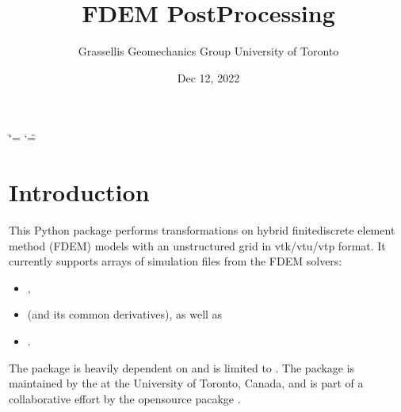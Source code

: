 \documentclass[letterpaper,10pt,english]{sphinxmanual}
\title{FDEM Post\sphinxhyphen{}Processing}
\date{Dec 12, 2022}
\author{Grasselli\textquotesingle{}s Geomechanics Group \sphinxhyphen{} University of Toronto}
\begin{document}
\ifdefined\shorthandoff
  \ifnum\catcode`\=\string=\active\shorthandoff{=}\fi
  \ifnum\catcode`\"=\active{}\fi
\fi

\pagestyle{empty}
\sphinxmaketitle
\pagestyle{plain}
\sphinxtableofcontents
\pagestyle{normal}
\label{\detokenize{index::doc}}


\sphinxstepscope


\chapter{Introduction}
\label{\detokenize{postprocessing_intro:introduction}}\label{\detokenize{postprocessing_intro::doc}}
\sphinxAtStartPar
This Python package performs transformations on hybrid finite\sphinxhyphen{}discrete element method (FDEM) models with an unstructured grid in vtk/vtu/vtp format. It currently supports arrays of simulation files from the FDEM solvers:
\begin{itemize}
\item {} 
\sphinxAtStartPar
{},

\item {} 
\sphinxAtStartPar
{} (and its common derivatives), as well as

\item {} 
\sphinxAtStartPar
{}.

\end{itemize}

\sphinxAtStartPar
The package is heavily dependent on  and is limited to . The package is maintained by the  at the University of Toronto, Canada, and is part of a collaborative effort by the open\sphinxhyphen{}source pacakge .
\end{document}
